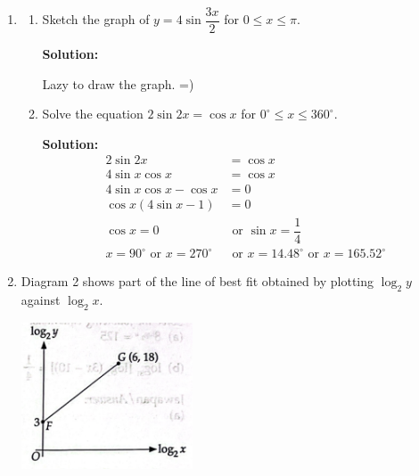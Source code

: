 \documentclass{report}
\newcommand{\sol}{\textbf{Solution:}}
\begin{document}
\begin{enumerate}[leftmargin=*]
    \item \begin{enumerate}
              \item Sketch the graph of $y=4 \sin \dfrac{3 x}{2}$ for $0 \leqslant x \leqslant
                        \pi$.

                    \sol{}

                    Lazy to draw the graph. =)

              \item Solve the equation $2 \sin 2 x=\cos x$ for $0^{\circ} \leqslant x \leqslant
                        360^{\circ}$.

                    \sol{}
                    \begin{align*}
                        2 \sin 2 x                                 & = \cos x                                                     \\
                        4 \sin x \cos x                            & = \cos x                                                     \\
                        4 \sin x\cos x - \cos x                    & = 0                                                          \\
                        \cos x(4 \sin x - 1)                       & = 0                                                          \\
                        \cos x = 0                                 & \text{ or } \sin x = \dfrac{1}{4}                            \\
                        x = 90^{\circ} \text{ or } x = 270^{\circ} & \text{ or } x = 14.48^{\circ} \text{ or } x = 165.52^{\circ}
                    \end{align*}
          \end{enumerate}

    \item Diagram 2 shows part of the line of best fit obtained by plotting $\log _2 y$
          against $\log _2 x$.

          \begin{center}
              \includegraphics[width=0.4\textwidth]{./assets/p1.7.png}
          \end{center}


\end{enumerate}
\end{document}
